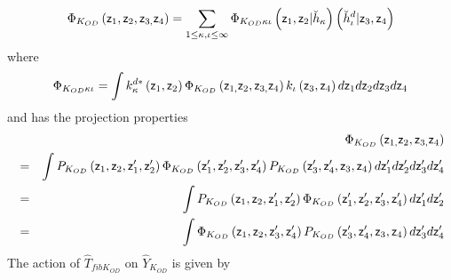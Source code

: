 \begin{equation}
\Phi _{K_{OD}}\left( {\sf z}_{1},{\sf z}_{2},{\sf z}_{3,}{\sf z}_{4}\right)
=\sum_{1\leq \kappa ,\iota \leq \infty }\Phi _{K_{OD}\kappa \iota }\left( 
{\sf z}_{1},{\sf z}_{2}|\breve{h}_{\kappa }\right) \left( \breve{h}_{\iota
}^{d}|{\sf z}_{3},{\sf z}_{4}\right)
\end{equation}%
where 
\begin{equation}
\Phi _{K_{OD}\kappa \iota }=\int k_{\kappa }^{d\ast }\left( {\sf z}_{1},{\sf %
z}_{2}\right) \Phi _{K_{OD}}\left( {\sf z}_{1,}{\sf z}_{2},{\sf z}_{3,}{\sf z%
}_{4}\right) k_{\iota }\left( {\sf z}_{3},{\sf z}_{4}\right) d{\sf z}_{1}d%
{\sf z}_{2}d{\sf z}_{3}d{\sf z}_{4}
\end{equation}%
and has the projection properties 
\begin{eqnarray}
&&\Phi _{K_{OD}}\left( {\sf z}_{1,}{\sf z}_{2},{\sf z}_{3,}{\sf z}_{4}\right)
\nonumber \\
&=&\int P_{K_{OD}}\left( {\sf z}_{1},{\sf z}_{2},{\sf z}_{1}^{\prime },{\sf z%
}_{2}^{\prime }\right) \Phi _{K_{OD}}\left( {\sf z}_{1}^{\prime },{\sf z}%
_{2}^{\prime },{\sf z}_{3}^{\prime },{\sf z}_{4}^{\prime }\right)
P_{K_{OD}}\left( {\sf z}_{3}^{\prime },{\sf z}_{4}^{\prime },{\sf z}_{3},%
{\sf z}_{4}\right) d{\sf z}_{1}^{\prime }d{\sf z}_{2}^{\prime }d{\sf z}%
_{3}^{\prime }d{\sf z}_{4}^{\prime }  \nonumber \\
&=&\int P_{K_{OD}}\left( {\sf z}_{1},{\sf z}_{2},{\sf z}_{1}^{\prime },{\sf z%
}_{2}^{\prime }\right) \Phi _{K_{OD}}\left( {\sf z}_{1}^{\prime },{\sf z}%
_{2}^{\prime },{\sf z}_{3}^{\prime },{\sf z}_{4}^{\prime }\right) d{\sf z}%
_{1}^{\prime }d{\sf z}_{2}^{\prime }  \nonumber \\
&=&\int \Phi _{K_{OD}}\left( {\sf z}_{1},{\sf z}_{2},{\sf z}_{3}^{\prime },%
{\sf z}_{4}^{\prime }\right) P_{K_{OD}}\left( {\sf z}_{3}^{\prime },{\sf z}%
_{4}^{\prime },{\sf z}_{3},{\sf z}_{4}\right) d{\sf z}_{3}^{\prime }d{\sf z}%
_{4}^{\prime }
\end{eqnarray}%
The action of $\hat{T}_{fibK_{OD}}$ on $\hat{Y}_{K_{OD}}$ is given by 
